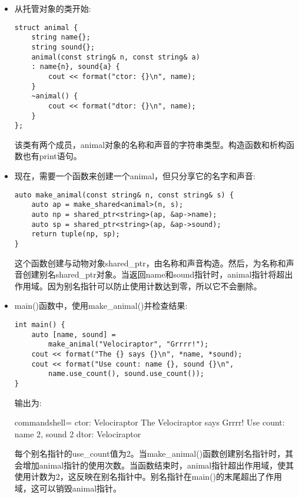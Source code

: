\begin{itemize}
\item 
从托管对象的类开始:

\begin{lstlisting}[style=styleCXX]
struct animal {
	string name{};
	string sound{};
	animal(const string& n, const string& a)
	: name{n}, sound{a} {
		cout << format("ctor: {}\n", name);
	}
	~animal() {
		cout << format("dtor: {}\n", name);
	}
};
\end{lstlisting}

该类有两个成员，animal对象的名称和声音的字符串类型。构造函数和析构函数也有print语句。

\item 
现在，需要一个函数来创建一个animal，但只分享它的名字和声音:

\begin{lstlisting}[style=styleCXX]
auto make_animal(const string& n, const string& s) {
	auto ap = make_shared<animal>(n, s);
	auto np = shared_ptr<string>(ap, &ap->name);
	auto sp = shared_ptr<string>(ap, &ap->sound);
	return tuple(np, sp);
}
\end{lstlisting}

这个函数创建与动物对象shared\_ptr，由名称和声音构造。然后，为名称和声音创建别名shared\_ptr对象。当返回name和sound指针时，animal指针将超出作用域。因为别名指针可以防止使用计数达到零，所以它不会删除。

\item 
main()函数中，使用make\_animal()并检查结果:

\begin{lstlisting}[style=styleCXX]
int main() {
	auto [name, sound] =
		make_animal("Velociraptor", "Grrrr!");
	cout << format("The {} says {}\n", *name, *sound);
	cout << format("Use count: name {}, sound {}\n",
		name.use_count(), sound.use_count());
}
\end{lstlisting}

输出为:

\begin{tcblisting}{commandshell={}}
ctor: Velociraptor
The Velociraptor says Grrrr!
Use count: name 2, sound 2
dtor: Velociraptor
\end{tcblisting}

每个别名指针的use\_count值为2。当make\_animal()函数创建别名指针时，其会增加animal指针的使用次数。当函数结束时，animal指针超出作用域，使其使用计数为2，这反映在别名指针中。别名指针在main()的末尾超出了作用域，这可以销毁animal指针。

\end{itemize}

